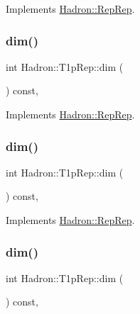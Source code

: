 Implements \mbox{\hyperlink{structHadron_1_1RepRep_a92c8802e5ed7afd7da43ccfd5b7cd92b}{Hadron\+::\+Rep\+Rep}}.

\mbox{\label{structHadron_1_1T1pRep_a8701f4d6be60663f10c103c8c53a191a}} 
\subsubsection{\texorpdfstring{dim()}{dim()}\hspace{0.1cm}{\footnotesize\ttfamily [3/5]}}
{\footnotesize\ttfamily int Hadron\+::\+T1p\+Rep\+::dim (\begin{DoxyParamCaption}{ }\end{DoxyParamCaption}) const\hspace{0.3cm}{\ttfamily [inline]}, {\ttfamily [virtual]}}



Implements \mbox{\hyperlink{structHadron_1_1RepRep_a92c8802e5ed7afd7da43ccfd5b7cd92b}{Hadron\+::\+Rep\+Rep}}.

\mbox{\label{structHadron_1_1T1pRep_a8701f4d6be60663f10c103c8c53a191a}} 
\subsubsection{\texorpdfstring{dim()}{dim()}\hspace{0.1cm}{\footnotesize\ttfamily [4/5]}}
{\footnotesize\ttfamily int Hadron\+::\+T1p\+Rep\+::dim (\begin{DoxyParamCaption}{ }\end{DoxyParamCaption}) const\hspace{0.3cm}{\ttfamily [inline]}, {\ttfamily [virtual]}}



Implements \mbox{\hyperlink{structHadron_1_1RepRep_a92c8802e5ed7afd7da43ccfd5b7cd92b}{Hadron\+::\+Rep\+Rep}}.

\mbox{\label{structHadron_1_1T1pRep_a8701f4d6be60663f10c103c8c53a191a}} 
\subsubsection{\texorpdfstring{dim()}{dim()}\hspace{0.1cm}{\footnotesize\ttfamily [5/5]}}
{\footnotesize\ttfamily int Hadron\+::\+T1p\+Rep\+::dim (\begin{DoxyParamCaption}{ }\end{DoxyParamCaption}) const\hspace{0.3cm}{\ttfamily [inline]}, {\ttfamily [virtual]}}



